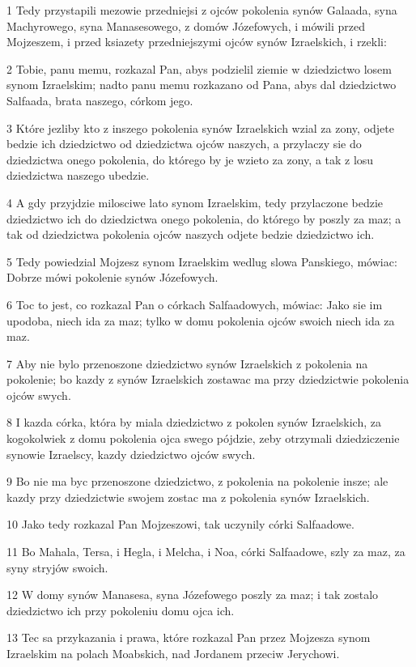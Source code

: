 \par 1 Tedy przystapili mezowie przedniejsi z ojców pokolenia synów Galaada, syna Machyrowego, syna Manasesowego, z domów Józefowych, i mówili przed Mojzeszem, i przed ksiazety przedniejszymi ojców synów Izraelskich, i rzekli:
\par 2 Tobie, panu memu, rozkazal Pan, abys podzielil ziemie w dziedzictwo losem synom Izraelskim; nadto panu memu rozkazano od Pana, abys dal dziedzictwo Salfaada, brata naszego, córkom jego.
\par 3 Które jezliby kto z inszego pokolenia synów Izraelskich wzial za zony, odjete bedzie ich dziedzictwo od dziedzictwa ojców naszych, a przylaczy sie do dziedzictwa onego pokolenia, do którego by je wzieto za zony, a tak z losu dziedzictwa naszego ubedzie.
\par 4 A gdy przyjdzie milosciwe lato synom Izraelskim, tedy przylaczone bedzie dziedzictwo ich do dziedzictwa onego pokolenia, do którego by poszly za maz; a tak od dziedzictwa pokolenia ojców naszych odjete bedzie dziedzictwo ich.
\par 5 Tedy powiedzial Mojzesz synom Izraelskim wedlug slowa Panskiego, mówiac: Dobrze mówi pokolenie synów Józefowych.
\par 6 Toc to jest, co rozkazal Pan o córkach Salfaadowych, mówiac: Jako sie im upodoba, niech ida za maz; tylko w domu pokolenia ojców swoich niech ida za maz.
\par 7 Aby nie bylo przenoszone dziedzictwo synów Izraelskich z pokolenia na pokolenie; bo kazdy z synów Izraelskich zostawac ma przy dziedzictwie pokolenia ojców swych.
\par 8 I kazda córka, która by miala dziedzictwo z pokolen synów Izraelskich, za kogokolwiek z domu pokolenia ojca swego pójdzie, zeby otrzymali dziedziczenie synowie Izraelscy, kazdy dziedzictwo ojców swych.
\par 9 Bo nie ma byc przenoszone dziedzictwo, z pokolenia na pokolenie insze; ale kazdy przy dziedzictwie swojem zostac ma z pokolenia synów Izraelskich.
\par 10 Jako tedy rozkazal Pan Mojzeszowi, tak uczynily córki Salfaadowe.
\par 11 Bo Mahala, Tersa, i Hegla, i Melcha, i Noa, córki Salfaadowe, szly za maz, za syny stryjów swoich.
\par 12 W domy synów Manasesa, syna Józefowego poszly za maz; i tak zostalo dziedzictwo ich przy pokoleniu domu ojca ich.
\par 13 Tec sa przykazania i prawa, które rozkazal Pan przez Mojzesza synom Izraelskim na polach Moabskich, nad Jordanem przeciw Jerychowi.


